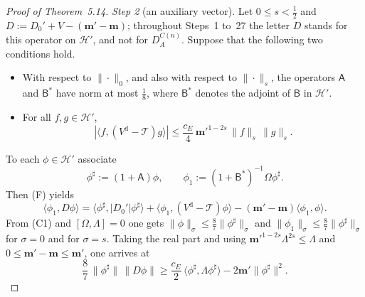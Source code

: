 \documentclass[11pt,letterpaper,reqno]{amsart}
\theoremstyle{definition}
\begin{document}
\begin{proof}[Proof of Theorem~5.14]
\emph{Step 2} (an auxiliary vector).
Let $0\le s<\frac12$ and $D:=D_0'+V-(\mathbf m'-\mathbf m)$;
throughout Steps~1 to~27 the letter $D$ stands for this operator on $\mathcal H'$, and not for $D^{C(n)}_A$.
Suppose that the following two conditions hold.
\begin{itemize}
\item[\textbf{(C1)}] With respect to $\|\cdot\|_0$, and also with respect to $\|\cdot\|_s$, the operators $\mathsf A$ and $\mathsf B^*$ have norm at most $\frac18$, where $\mathsf B^*$ denotes the adjoint of $\mathsf B$ in $\mathcal H'$.
\item[\textbf{(C2)}] For all $f,g\in\mathcal H'$,
\begin{equation*}
|\langle f,(V^{\mathrm d}-\mathcal T)g\rangle|\le\frac{c_E}{4}\,\mathbf m'^{1-2s}\,\|f\|_s\,\|g\|_s.
\end{equation*}
\end{itemize}
To each $\phi\in\mathcal H'$ associate
\begin{equation*}
\phi^\sharp:=(1+\mathsf A)\phi,\qquad\phi_1:=(1+\mathsf B^*)^{-1}\Omega\phi^\sharp.
\end{equation*}
Then (F) yields
\begin{equation*}
\langle\phi_1,D\phi\rangle=\langle\phi^\sharp,|D_0'|\phi^\sharp\rangle+\langle\phi_1,(V^{\mathrm d}-\mathcal T)\phi\rangle-(\mathbf m'-\mathbf m)\langle\phi_1,\phi\rangle.
\end{equation*}
From (C1) and $[\Omega,\Lambda]=0$ one gets $\|\phi\|_\sigma\le\frac87\|\phi^\sharp\|_\sigma$ and $\|\phi_1\|_\sigma\le\frac87\|\phi^\sharp\|_\sigma$ for $\sigma=0$ and for $\sigma=s$.
Taking the real part and using $\mathbf m'^{1-2s}\Lambda^{2s}\le\Lambda$ and $0\le\mathbf m'-\mathbf m\le\mathbf m'$, one arrives at
\begin{equation*}
\frac87\,\|\phi^\sharp\|\,\|D\phi\|\ge\frac{c_E}{2}\,\langle\phi^\sharp,\Lambda\phi^\sharp\rangle-2\mathbf m'\|\phi^\sharp\|^2.
\end{equation*}


\end{proof}
\end{document}
